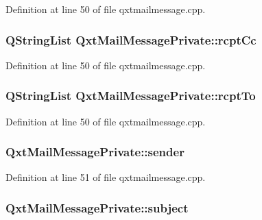 Definition at line 50 of file qxtmailmessage.\-cpp.

\hypertarget{struct_qxt_mail_message_private_a2f20a66e59447730c829c613aad9cdf7}{
\subsubsection[{rcpt\-Cc}]{\setlength{\rightskip}{0pt plus 5cm}Q\-String\-List Qxt\-Mail\-Message\-Private\-::rcpt\-Cc}}\label{struct_qxt_mail_message_private_a2f20a66e59447730c829c613aad9cdf7}


Definition at line 50 of file qxtmailmessage.\-cpp.

\hypertarget{struct_qxt_mail_message_private_a2c213268a40ead0fff52429eab1f202f}{
\subsubsection[{rcpt\-To}]{\setlength{\rightskip}{0pt plus 5cm}Q\-String\-List Qxt\-Mail\-Message\-Private\-::rcpt\-To}}\label{struct_qxt_mail_message_private_a2c213268a40ead0fff52429eab1f202f}


Definition at line 50 of file qxtmailmessage.\-cpp.

\hypertarget{struct_qxt_mail_message_private_ac9edcfbd983f75f565ff1a9b1a4fac32}{
\subsubsection[{sender}]{ Qxt\-Mail\-Message\-Private\-::sender}}\label{struct_qxt_mail_message_private_ac9edcfbd983f75f565ff1a9b1a4fac32}


Definition at line 51 of file qxtmailmessage.\-cpp.

\hypertarget{struct_qxt_mail_message_private_a0f9808e182950b8c18d1d26538fe8658}{
\subsubsection[{subject}]{ Qxt\-Mail\-Message\-Private\-::subject}}\label{struct_qxt_mail_message_private_a0f9808e182950b8c18d1d26538fe8658}


